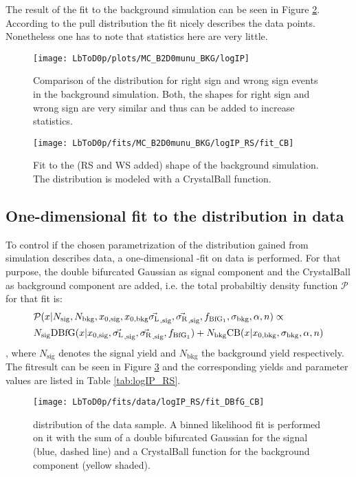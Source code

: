 The result of the fit to the background simulation can be seen in Figure \ref{fig:fit_logIP_MC_BKG}.
According to the pull distribution the fit nicely describes the data points.
Nonetheless one has to note that statistics here are very little.
\begin{figure}[ptb]
    \centering
	\texttt{[image: LbToD0p/plots/MC\_B2D0munu\_BKG/logIP]}
	\caption{Comparison of the \logIP distribution for right sign and wrong sign events in the background simulation. Both, the shapes for right sign and wrong sign are very similar and thus can be added to increase statistics.}
    \label{fig:plot_logIP_MC_BKG}
\end{figure}
\begin{figure}[ptb]
    \centering
	\texttt{[image: LbToD0p/fits/MC\_B2D0munu\_BKG/logIP\_RS/fit\_CB]}
	\caption{Fit to the (RS and WS added) \logIP shape of the background simulation.
             The distribution is modeled with a CrystalBall function.}
    \label{fig:fit_logIP_MC_BKG}
\end{figure}

\subsection{One-dimensional fit to the \logIP distribution in data}
\label{sec:ControlLogIP}
To control if the chosen parametrization of the \logIP distribution gained from simulation describes data, a one-dimensional \logIP-fit on data is performed.
For that purpose, the double bifurcated Gaussian as signal component and the CrystalBall as background component are added, i.e. the total probabiltiy density function $\mathcal{P}$ for that fit is:
\begin{align}
    &\mathcal{P}(x|N_\text{sig}, N_\text{bkg}, x_{0, \text{sig}}, x_{0, \text{bkg}} \vec{\sigma_{\text{L}_{}}}_{,\text{sig}}, \vec{\sigma_{\text{R}_{}}}_{,\text{sig}}, f_{\text{BfG}_1}, \sigma_\text{bkg}, \alpha, n) \propto \nonumber\\
    &N_\text{sig} \text{DBfG}(x|x_{0, \text{sig}}, \vec{\sigma_{\text{L}_{}}}_{,\text{sig}}, \vec{\sigma_{\text{R}_{}}}_{,\text{sig}}, f_{\text{BfG}_1}) + N_\text{bkg} \text{CB}(x| x_{0, \text{bkg}}, \sigma_\text{bkg}, \alpha, n)
\end{align},
where $N_\text{sig}$ denotes the signal yield and $N_\text{bkg}$ the background yield respectively.
The fitresult can be seen in Figure \ref{fig:fit_logIP_RS} and the corresponding yields and parameter values are listed in Table \ref{tab:logIP_RS}.
\begin{figure}[ptb]
    \centering
	\texttt{[image: LbToD0p/fits/data/logIP\_RS/fit\_DBfG\_CB]}
	\caption{\logIP distribution of the data sample.
             A binned likelihood fit is performed on it with the sum of a double bifurcated Gaussian for the signal (blue, dashed line) and a CrystalBall function for the background component (yellow shaded). }
    \label{fig:fit_logIP_RS}
\end{figure}


